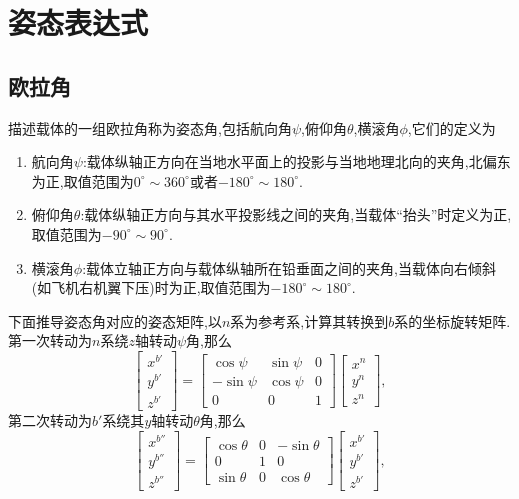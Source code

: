 \documentclass[10pt,a4paper]{ctexbook}
\theoremstyle{definition}
\begin{document}
\thispagestyle{empty}

\newpage
{}
\setcounter{page}{1}

\tableofcontents

\newpage
{}
\setcounter{page}{1}

\chapter{姿态表达式}

\section{欧拉角}

描述载体的一组欧拉角称为姿态角,包括航向角$\psi$,俯仰角$\theta$,横滚角$\phi$,它们的定义为
\begin{enumerate}[noitemsep]
    \kaishu
    \item 航向角$\psi$:载体纵轴正方向在当地水平面上的投影与当地地理北向的夹角,北偏东为正,取值范围为$0^{\circ}\sim 360^{\circ}$或者$-180^{\circ}\sim 180^{\circ}$.
    \item 俯仰角$\theta$:载体纵轴正方向与其水平投影线之间的夹角,当载体“抬头”时定义为正,取值范围为$-90^{\circ}\sim 90^{\circ}$.
    \item 横滚角$\phi$:载体立轴正方向与载体纵轴所在铅垂面之间的夹角,当载体向右倾斜(如飞机右机翼下压)时为正,取值范围为$-180^{\circ}\sim 180^{\circ}$.
\end{enumerate}
下面推导姿态角对应的姿态矩阵,以$n$系为参考系,计算其转换到$b$系的坐标旋转矩阵.第一次转动为$n$系绕$z$轴转动$\psi$角,那么
\[
    \begin{bmatrix}
        x^{b'} \\ y^{b'} \\ z^{b'}
    \end{bmatrix}=\begin{bmatrix}
        \cos\psi & \sin\psi & 0 \\
        -\sin\psi & \cos\psi & 0 \\
        0 & 0 & 1
    \end{bmatrix}\begin{bmatrix}
        x^n \\ y^n \\ z^n
    \end{bmatrix},
\]
第二次转动为$b'$系绕其$y$轴转动$\theta$角,那么
\[
    \begin{bmatrix}
        x^{b''} \\ y^{b''} \\ z^{b''}
    \end{bmatrix}=\begin{bmatrix}
        \cos\theta & 0 & -\sin\theta \\
        0 & 1 & 0 \\
        \sin\theta & 0 & \cos\theta
    \end{bmatrix}\begin{bmatrix}
        x^{b'} \\ y^{b'} \\ z^{b'}
    \end{bmatrix},
\]
\end{document}
